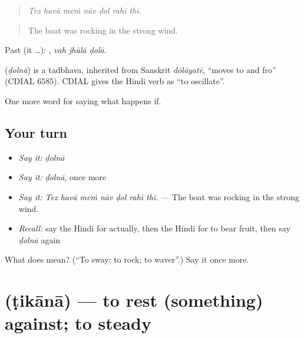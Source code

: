 \begin{quote}
      
\end{quote}

\begin{quote}
\emph{Tez havā meṁ nāv ḍol rahī thī.}
\end{quote}

\begin{quote}
The boat was rocking in the strong wind.
\end{quote}

Past (it …):   , \emph{vah jhūlā ḍolā}.

\begin{cousinweb}
\textbf{} (\emph{ḍolnā}) is a tadbhava, inherited from Sanskrit \emph{dōlāyatē}, \textquotedblleft{}moves to and fro\textquotedblright{} (CDIAL 6585). CDIAL gives the Hindi verb as \textquotedblleft{}to oscillate\textquotedblright{}.
\end{cousinweb}

\begin{grammarlens}[title={What you've built}]
One more word for saying what happens if.
\end{grammarlens}

\subsection*{Your turn}
\begin{itemize}
\raggedright
  \item \emph{Say it:} \emph{ḍolnā}
  \item \emph{Say it:} \emph{ḍolnā}, once more
  \item \emph{Say it:} \emph{Tez havā meṁ nāv ḍol rahī thī.} — The boat was rocking in the strong wind.
  \item \emph{Recall:} say the Hindi for actually, then the Hindi for to bear fruit, then say \emph{ḍolnā} again
\end{itemize}

\begin{tcolorbox}[breakable,colback=teal!4,colframe=teal!35!black,title={Before you move on}]
What does  mean? (\textquotedblleft{}To sway; to rock; to waver\textquotedblright{}.) Say it once more.
\end{tcolorbox}
\section[\texorpdfstring{\hi{टिकाना} (ṭikānā)}{टिकाना (ṭikānā)}]{ (ṭikānā) — to rest (something) against; to steady}

